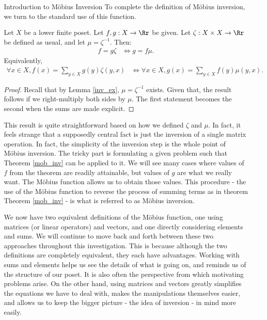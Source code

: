 \documentclass[12pt]{pom_thesis}
\begin{document}
\begin{chapter}{Introduction to M\"obius Inversion}
To complete the definition of M\"obius inversion, we turn to the standard use of this function. 
\begin{thm}\label{mob_inv}
Let $X$ be a lower finite poset. Let $f,g:X \rightarrow \Rr$ be given. Let $\zeta:X \times X \rightarrow \Rr$ be defined as usual, and let $\mu = \zeta^{-1}$. Then:
\begin{align*}
f = g \zeta & \iff g = f \mu.
\end{align*}
Equivalently,
\begin{align*}
\forall x \in X, f(x) = \sum_{y \in X} g(y)\zeta(y,x) &\iff \forall x \in X, g(x) = \sum_{y \in X} f(y)\mu(y,x).
\end{align*}
\end{thm}
\begin{proof}
Recall that by Lemma \ref{inv_ex}, $\mu = \zeta^{-1}$ exists. Given that, the result follows if we right-multiply both sides by $\mu$. The first statement becomes the second when the sums are made explicit.
\end{proof}

This result is quite straightforward based on how we defined $\zeta$ and $\mu$. In fact, it feels strange that a supposedly central fact is just the inversion of a single matrix operation. In fact, the simplicity of the inversion step is the whole point of M\"obius inversion. The tricky part is formulating a given problem such that Theorem \ref{mob_inv} can be applied to it. We will see many cases where values of $f$ from the theorem are readily attainable, but values of $g$ are what we really want. The M\"obius function allows us to obtain those values. This procedure - the use of the M\"obius function to reverse the process of summing terms as in theorem Theorem \ref{mob_inv} - is what is referred to as M\"obius inversion.

We now have two equivalent definitions of the M\"obius function, one using matrices (or linear operators) and vectors, and one directly considering elements and sums. We will continue to move back and forth between these two approaches throughout this investigation. This is because although the two definitions are completely equivalent, they each have advantages. Working with sums and elements helps us see the details of what is going on, and reminds us of the structure of our poset. It is also often the perspective from which motivating problems arise. On the other hand, using matrices and vectors greatly simplifies the equations we have to deal with, makes the manipulations themselves easier, and allows us to keep the bigger picture - the idea of inversion - in mind more easily. 

\end{chapter}
\end{document}
